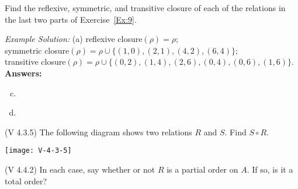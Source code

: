\documentclass[fleqn,addpoints,12pt]{exam}
\newif\ifanswers
\theoremstyle{remark}
\begin{document}
\begin{questions}
\begin{solution}
\begin{parts}
    \part 
  \end{parts}
  \end{solution}
  \ifanswers \vskip1cm \else \newpage \fi

  \question[2] %
  Find the reflexive, symmetric, and transitive closure of
  each of the relations in the last two parts of Exercise~\ref{Ex:9}.

  \smallskip

  {\it Example Solution:}
  (a) reflexive closure$(\rho) = \rho$;\\[5pt]
      symmetric closure$(\rho) = \rho \cup \{(1,0), (2,1), (4,2), (6,4)\}$;\\[5pt]
      transitive closure$(\rho) = \rho \cup \{(0,2), (1,4), (2,6), (0,4), (0,6), (1,6)\}$.\\[10pt]
  {\bf Answers:}
    \begin{enumerate}[(a)]
      \setcounter{enumi}{2}
    \item ~\\[2cm]
    \item
    \end{enumerate}

  \begin{solution}   
    \begin{parts} 
      \part 
    \end{parts}
  \end{solution}
  \ifanswers \vskip1cm \else \vskip3cm \fi


  \question[2] (V 4.3.5)
  The following diagram shows two relations $R$ and $S$. Find $S \circ R$.
  \begin{center}
    \texttt{[image: V-4-3-5]}
  \end{center}
  \medskip
  \begin{solution}  \end{solution}
  \ifanswers \vskip1cm \else \newpage \fi



  \question[3] (V 4.4.2)
  In each case, say whether or not $R$ is a partial order on $A$. If so, is it a
  total order?
  \begin{parts}

\end{parts}
\end{questions}
\end{document}
